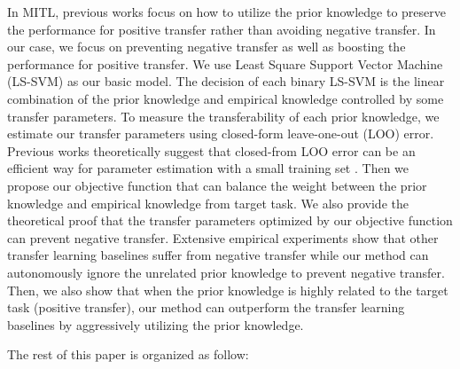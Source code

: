 In MITL, previous works focus on how to utilize the prior knowledge to preserve the performance for positive transfer rather than avoiding negative transfer. In our case, we focus on preventing negative transfer as well as boosting the performance for positive transfer. 
We use Least Square Support Vector Machine (LS-SVM) \cite{suykens1999least} as our basic model. The decision of each binary LS-SVM is the linear combination of the prior knowledge and empirical knowledge controlled by some transfer parameters. To measure the transferability of each prior knowledge, we estimate our transfer parameters using closed-form leave-one-out (LOO) error. Previous works theoretically suggest that closed-from LOO error can be an efficient way for parameter estimation with a small training set \cite{kuzborskij2013stability} \cite{cawley2006leave}. Then we propose our objective function that can balance the weight between the prior knowledge and empirical knowledge from target task. We also provide the theoretical proof that the transfer parameters optimized by our objective function can prevent negative transfer. Extensive empirical experiments show that other transfer learning baselines suffer from negative transfer while our method can autonomously ignore the unrelated prior knowledge to prevent negative transfer. Then, we also show that when the prior knowledge is highly related to the target task (positive transfer), our method can outperform the transfer learning baselines by aggressively utilizing the prior knowledge.

The rest of this paper is organized as follow:
  


